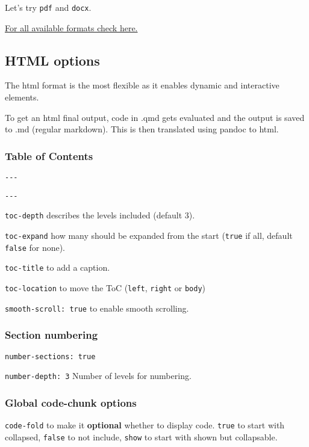 \documentclass[
  letterpaper,
  DIV=11,
  numbers=noendperiod]{scrartcl}
\begin{document}
Let's try \texttt{pdf} and \texttt{docx}.

\href{https://quarto.org/docs/output-formats/all-formats.html}{For all
available formats check here.}

\hypertarget{html-options}{%
\subsection{HTML options}\label{html-options}}

The html format is the most flexible as it enables dynamic and
interactive elements.

To get an html final output, code in .qmd gets evaluated and the output
is saved to .md (regular markdown). This is then translated using pandoc
to html.

\hypertarget{table-of-contents}{%
\subsubsection{Table of Contents}\label{table-of-contents}}

\texttt{-\/-\/-}

\texttt{-\/-\/-}

\texttt{toc-depth} describes the levels included (default 3).

\texttt{toc-expand} how many should be expanded from the start
(\texttt{true} if all, default \texttt{false} for none).

\texttt{toc-title} to add a caption.

\texttt{toc-location} to move the ToC (\texttt{left}, \texttt{right} or
\texttt{body})

\texttt{smooth-scroll:\ true} to enable smooth scrolling.

\hypertarget{section-numbering}{%
\subsubsection{Section numbering}\label{section-numbering}}

\texttt{number-sections:\ true}

\texttt{number-depth:\ 3} Number of levels for numbering.

\hypertarget{global-code-chunk-options}{%
\subsubsection{Global code-chunk
options}\label{global-code-chunk-options}}

\texttt{code-fold} to make it \textbf{optional} whether to display code.
\texttt{true} to start with collapsed, \texttt{false} to not include,
\texttt{show} to start with shown but collapsable.
\end{document}
